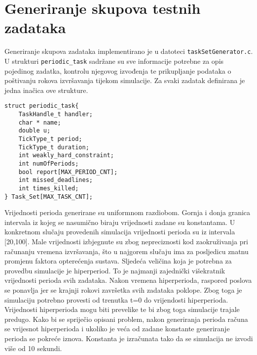 \documentclass[../zavrsni.tex]{subfiles}
\begin{document}
\section{Generiranje skupova testnih zadataka}




Generiranje skupova zadataka implementirano je u datoteci \texttt{taskSetGenerator.c}. U strukturi \texttt{periodic\_task} sadržane su sve 
informacije potrebne za opis pojedinog zadatka, kontrolu njegovog izvođenja te prikupljanje podataka o poštivanju rokova 
izvršavanja tijekom simulacije. Za svaki zadatak definirana je jedna inačica ove strukture. 
\begin{lstlisting}[style=CStyle,caption={Struktura periodic\_task},captionpos=b]
struct periodic_task{
    TaskHandle_t handler;
    char * name;
    double u;
    TickType_t period;
    TickType_t duration;
    int weakly_hard_constraint;
    int numOfPeriods;
    bool report[MAX_PERIOD_CNT];
    int missed_deadlines;
    int times_killed;
} Task_Set[MAX_TASK_CNT];
\end{lstlisting}

Vrijednosti perioda generirane su uniformnom razdiobom. Gornja i donja granica intervala iz kojeg se nasumično biraju vrijednosti zadane su konstantama.
U konkretnom slučaju provedenih simulacija vrijednosti perioda su iz intervala [20,100]. Male vrijednosti izbjegnute su zbog nepreciznosti kod zaokruživanja pri
računanju vremena izvršavanja, što u najgorem slučaju ima za posljedicu znatnu promjenu faktora opterećenja sustava. 
Sljedeća veličina koja je potrebna za 
provedbu simulacije je hiperperiod. To je najmanji zajednički višekratnik vrijednosti perioda svih zadataka. Nakon vremena hiperperioda, raspored poslova 
se ponavlja jer se krajnji rokovi završetka svih zadataka poklope. Zbog toga je simulaciju potrebno provesti od trenutka t=0 do vrijendosti hiperperioda. Vrijednosti hiperperioda mogu biti prevelike te 
bi zbog toga simulacije trajale predugo. Kako bi se spriječio opisani problem, nakon generiranja perioda računa se vrijesnot hiperperioda i ukoliko je veća od zadane konstante
 generiranje perioda se pokreće iznova. Konstanta je izračunata tako da se simulacija ne izvodi više od 10 sekundi.
\end{document}
